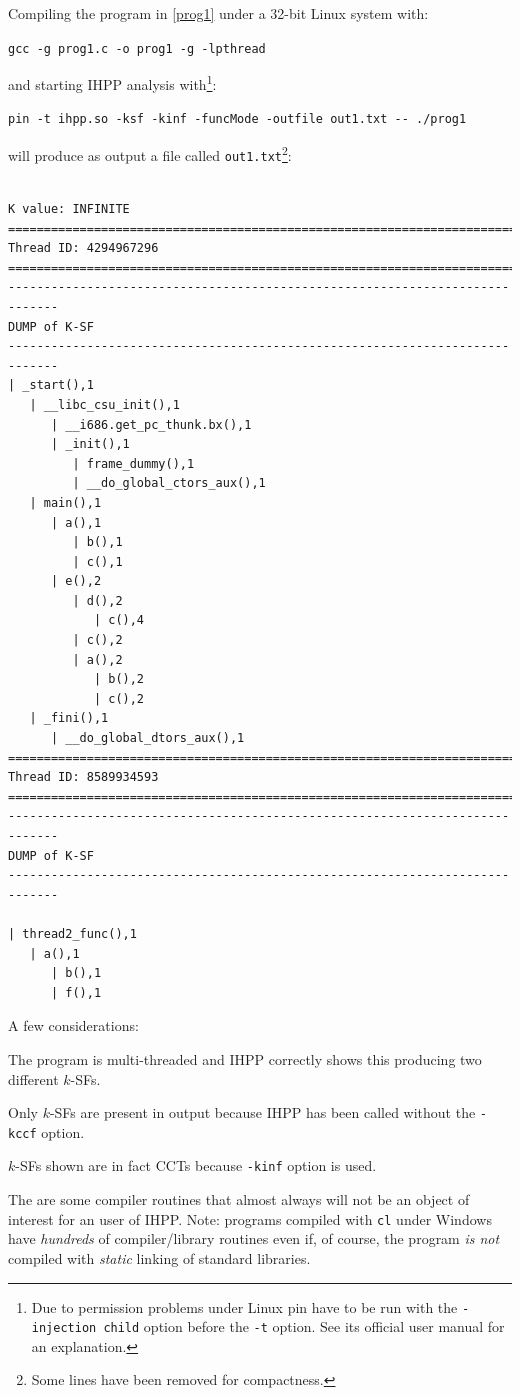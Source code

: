 \documentclass[a4paper,10pt]{report}
\begin{document}
\noindent
Compiling the program in \cref{prog1} under a 32-bit Linux system with:
\begin{center}
\verb|gcc -g prog1.c -o prog1 -g -lpthread|
\end{center}
and starting IHPP analysis with\footnote{Due to permission problems under Linux pin have to be run with the \texttt{-injection child} option before the \texttt{-t} option. See its official user manual for an explanation.}:
\begin{center}
\begin{verbatim}
pin -t ihpp.so -ksf -kinf -funcMode -outfile out1.txt -- ./prog1
\end{verbatim}
\end{center}

will produce as output a file called \verb|out1.txt|\footnote{Some lines have been removed for compactness.}:

\begin{lstlisting}[label=out1, caption=file out1.txt]

K value: INFINITE
=============================================================================
Thread ID: 4294967296
=============================================================================
-----------------------------------------------------------------------------
DUMP of K-SF
-----------------------------------------------------------------------------
| _start(),1
   | __libc_csu_init(),1
      | __i686.get_pc_thunk.bx(),1
      | _init(),1
         | frame_dummy(),1
         | __do_global_ctors_aux(),1
   | main(),1
      | a(),1
         | b(),1
         | c(),1
      | e(),2
         | d(),2
            | c(),4
         | c(),2
         | a(),2
            | b(),2
            | c(),2
   | _fini(),1
      | __do_global_dtors_aux(),1
=============================================================================
Thread ID: 8589934593
=============================================================================
-----------------------------------------------------------------------------
DUMP of K-SF
-----------------------------------------------------------------------------

| thread2_func(),1
   | a(),1
      | b(),1
      | f(),1
\end{lstlisting}


A few considerations:
\renewcommand{\labelitemi}{$-$}

\begin{itemize*}
\item The program is multi-threaded and IHPP correctly shows this 
producing two different $k$-SFs. 
\item Only $k$-SFs are present in output because IHPP has been called without the \verb|-kccf| option.
\item $k$-SFs shown are in fact CCTs because \verb|-kinf| option is used.
\item The are some compiler routines that almost always will not be an object of interest for an user of IHPP. Note: programs compiled with \verb|cl| under Windows have \emph{hundreds} of compiler\slash library routines even if, of course, the program \emph{is not} compiled with \emph{static} linking of standard libraries. 
\end{itemize*}
\end{document}
